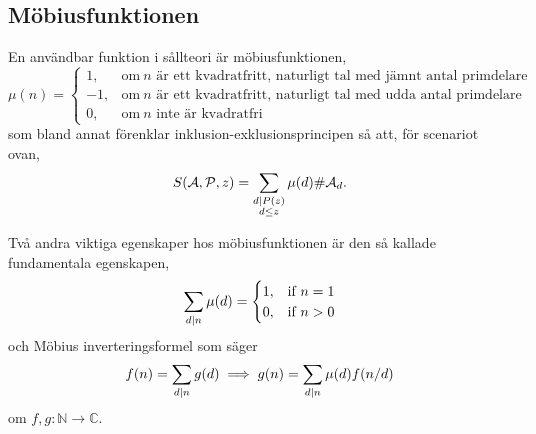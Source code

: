 \subsection{Möbiusfunktionen}
En användbar funktion i sållteori är möbiusfunktionen,
\begin{equation*}
    \mu(n) = 
    \begin{cases}
        1, & \text{om}\ n \text{ är ett kvadratfritt, naturligt tal med jämnt antal primdelare}\\
        -1, & \text{om}\ n \text{ är ett kvadratfritt, naturligt tal med udda antal primdelare}\\
        0, & \text{om}\ n \text{ inte är kvadratfri}
    \end{cases}
\end{equation*}
som bland annat förenklar inklusion-exklusionsprincipen så att, för scenariot ovan,
\begin{align*}
    S(\mathcal{A}, \mathcal{P}, z) = \sum_{\substack{d \mid P(z) \\ d \leq z}} \mu(d) \# \mathcal{A}_d .
\end{align*} %

Två andra viktiga egenskaper hos möbiusfunktionen är den så kallade fundamentala egenskapen,
\begin{equation*}
    \sum_{d \mid n} \mu(d) =
    \begin{cases}
        1, & \text{if}\ n = 1 \\
        0, & \text{if}\ n > 0
    \end{cases}
\end{equation*}
och Möbius inverteringsformel som säger
\begin{equation*}
    f(n) = \sum_{d \mid n} g(d) \implies g(n) = \sum_{d \mid n} \mu(d) f(n/d)
\end{equation*}
om \(f, g : \mathbb{N} \to \mathbb{C}\).


